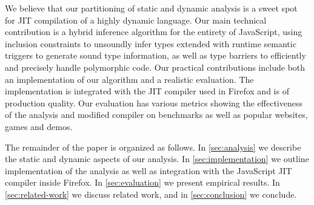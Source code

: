 We believe that our partitioning of static and dynamic analysis
is a sweet spot for JIT compilation of a highly dynamic language.
Our main technical contribution is a hybrid inference algorithm for the
entirety of JavaScript, using inclusion constraints to unsoundly infer
types extended with runtime semantic triggers to generate sound type
information, as well as type barriers to efficiently and precisely handle
polymorphic code. Our practical contributions include both an
implementation of our algorithm and a realistic evaluation. The implementation
is integrated with the JIT compiler used in Firefox and is of production
quality. Our evaluation has various metrics showing the effectiveness of the
analysis and modified compiler on benchmarks as well as popular websites,
games and demos.








The remainder of the paper is organized as follows. In \Section\ref{sec:analysis}
we describe the static and dynamic aspects of our
analysis. In \Section\ref{sec:implementation} we outline implementation of the
analysis as well as integration with the JavaScript JIT compiler inside
Firefox. In \Section\ref{sec:evaluation} we present empirical
results. In \Section\ref{sec:related-work} we discuss related work, and in
\Section\ref{sec:conclusion} we conclude.


